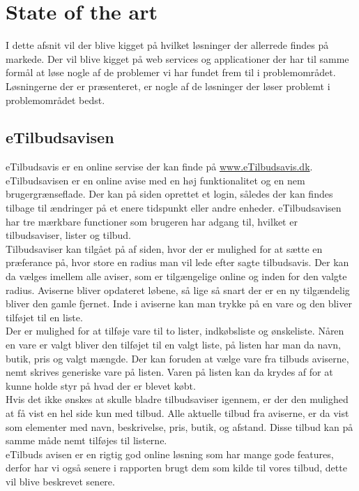 \chapter{State of the art}
I dette afsnit vil der blive kigget på hvilket løsninger der allerrede findes på markede. Der vil blive kigget på web services og applicationer der har til samme formål at løse nogle af de problemer vi har fundet frem til i problemområdet. Løsningerne der er præsenteret, er nogle af de løsninger der løser problemt i problemområdet bedst. 
\section{eTilbudsavisen}
eTilbudsavis er en online servise der kan finde på \underline{www.eTilbudsavis.dk}. eTilbudsavisen er en online avise med en høj funktionalitet og en nem brugergrænseflade. Der kan på siden oprettet et login, således der kan findes tilbage til ændringer på et enere tidspunkt eller andre enheder. eTilbudsavisen har tre mærkbare functioner som brugeren har adgang til, hvilket er tilbudsaviser, lister og tilbud.\\
Tilbudsaviser kan tilgået på af siden, hvor der er mulighed for at sætte en præferance på, hvor store en radius man vil lede efter sagte tilbudsavis. Der kan da vælges imellem alle aviser, som er tilgængelige online og inden for den valgte radius. Aviserne bliver opdateret løbene, så lige så snart der er en ny tilgændelig bliver den gamle fjernet. Inde i aviserne kan man trykke på en vare og den bliver tilføjet til en liste.\\
Der er mulighed for at tilføje vare til to lister, indkøbsliste og ønskeliste. Nåren en vare er valgt bliver den tilføjet til en valgt liste, på listen har man da navn, butik, pris og valgt mængde. Der kan foruden at vælge vare fra tilbuds aviserne, nemt skrives generiske vare på listen. Varen på listen kan da krydes af for at kunne holde styr på hvad der er blevet købt.\\ 
Hvis det ikke ønskes at skulle bladre tilbudsaviser igennem, er der den mulighed at få vist en hel side kun med tilbud. Alle aktuelle tilbud fra aviserne, er da vist som elementer med navn, beskrivelse, pris, butik, og afstand. Disse tilbud kan på samme måde nemt tilføjes til listerne.\\
eTilbuds avisen er en rigtig god online løsning som har mange gode features, derfor har vi også senere i rapporten brugt dem som kilde til vores tilbud, dette vil blive beskrevet senere.
